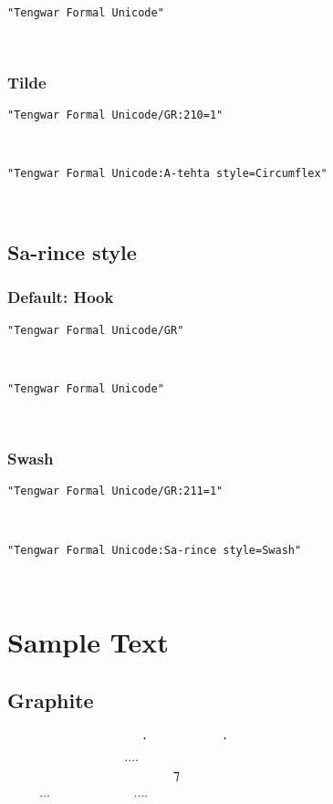 \documentclass[11pt,a4paper]{article}
\begin{document}
\formalGR 

\noindent \texttt{"Tengwar Formal Unicode"}

\formalAAT 

\subsubsection{Tilde}

\texttt{"Tengwar Formal Unicode/GR:210=1"}

\formalGRcircumflex 

\noindent \texttt{"Tengwar Formal Unicode:A-tehta style=Circumflex"}

\formalAATcircumflex 


\subsection{Sa-rince style}

\subsubsection{Default: Hook}

\texttt{"Tengwar Formal Unicode/GR"}

\formalGR 

\noindent \texttt{"Tengwar Formal Unicode"}

\formalAAT 

\subsubsection{Swash}

\texttt{"Tengwar Formal Unicode/GR:211=1"}

\formalGRswash 

\noindent \texttt{"Tengwar Formal Unicode:Sa-rince style=Swash"}

\formalAATswash 


\newpage

\section{Sample Text}

\subsection{Graphite}
\formalGR
  ‍   ⸱‍  ‍ ⸱ \\
    ‍....  ‍  \\
  ‍   ‍ ‍ ⁊ ‍  \\
...  .... \\
\end{document}

